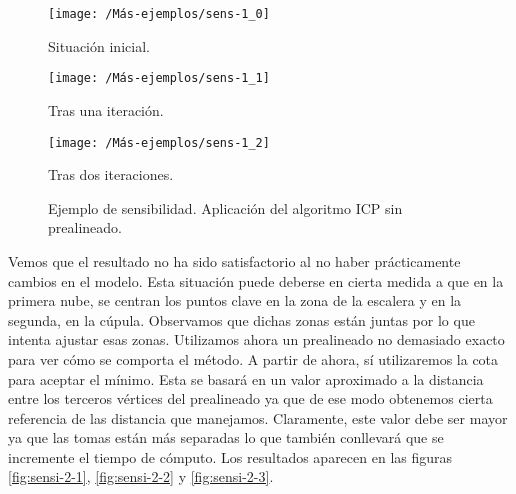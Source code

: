 \begin{figure}[h!]	
	\begin{minipage}[b]{0.5\textwidth}
		\centering		
		\texttt{[image: /Más-ejemplos/sens-1\_0]} 
		\caption*{Situación inicial.}
	\end{minipage}
	\begin{minipage}[b]{0.5\textwidth}
		\centering
		\texttt{[image: /Más-ejemplos/sens-1\_1]}
		\caption*{Tras una iteración.}
	\end{minipage}
	\begin{center}
		\begin{minipage}[b]{0.5\textwidth}
		\centering		
		\texttt{[image: /Más-ejemplos/sens-1\_2]} 
		\caption*{Tras dos iteraciones.}
	\end{minipage}
	\end{center}
	\caption{Ejemplo de sensibilidad. Aplicación del algoritmo ICP sin prealineado.}
	\label{fig:sensi-1}
\end{figure}

Vemos que el resultado no ha sido satisfactorio al no haber prácticamente cambios en el modelo. Esta situación puede deberse en cierta medida a que en la primera nube, se centran los puntos clave en la zona de la escalera y en la segunda, en la cúpula. Observamos que dichas zonas están juntas por lo que intenta ajustar esas zonas. Utilizamos ahora un prealineado no demasiado exacto para ver cómo se comporta el método.  A partir de ahora, sí utilizaremos la cota para aceptar el mínimo. Esta se basará en un valor aproximado a la distancia entre los terceros vértices del prealineado ya que de ese modo obtenemos cierta referencia de las distancia que manejamos. Claramente, este valor debe ser mayor ya que las tomas están más separadas lo que también conllevará que se incremente el tiempo de cómputo. Los resultados aparecen en las figuras \ref{fig:sensi-2-1}, \ref{fig:sensi-2-2} y \ref{fig:sensi-2-3}.\\


